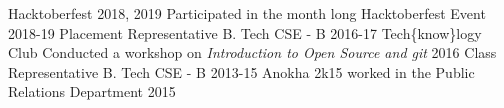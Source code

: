 \begin{cvhonors}
  \cvhonor
    {Hacktoberfest 2018, 2019}
    {Participated in the month long Hacktoberfest Event}
    {\empty}
    {2018-19}
  \cvhonor
    {Placement Representative}
    {B. Tech CSE - B}
    {\empty}
    {2016-17}
  \cvhonor
    {Tech\{know\}logy Club}
    {Conducted a workshop on \textit{Introduction to Open Source and git}}
    {}
    {2016}
 \cvhonor
    {Class Representative}
    {B. Tech CSE - B}
    {\empty}
    {2013-15}
  \cvhonor
    {Anokha 2k15}
    {worked in the Public Relations Department}
    {}
    {2015}
\end{cvhonors}